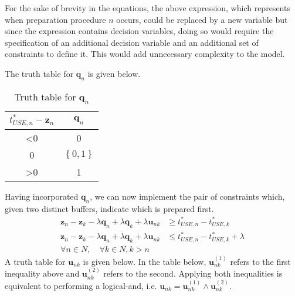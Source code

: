 For the sake of brevity in the equations, the above expression, which
represents when preparation procedure $n$ occurs, could be replaced by a new
variable but since the expression contains decision variables, doing so would
require the specification of an additional decision variable and an additional
set of constraints to define it.
This would add unnecessary complexity to the model.


The truth table for $ \boldsymbol{q}_{n} $ is given below.
\begin{table}[h!]
    \centering
    \caption{Truth table for $\boldsymbol{q}_{n}$}
    \label{tbl.truthq}
    \begin{tabular}{c | c}
        $t_{\mathit{USE},n}^{*} - \boldsymbol{z}_{n}$
        & $\boldsymbol{q}_{n}$\\ \hline
        <0 & 0\\
        0 & $\left\{ 0, 1 \right\}$\\
        >0 & 1\\
    \end{tabular}
\end{table}

Having incorporated $ \boldsymbol{q}_{n} $, we can now implement the pair of
constraints which, given two distinct buffers, indicate which is prepared
first.
\begin{equation}
    \begin{split}
        \boldsymbol{z}_{n} - \boldsymbol{z}_{k} - \lambda \boldsymbol{q}_{n}
        + \lambda \boldsymbol{q}_{k} + \lambda \boldsymbol{u}_{nk} &\ge
        t_{\mathit{USE},n}^{*} - t_{\mathit{USE},k}^{*}\\
        \boldsymbol{z}_{n} - \boldsymbol{z}_{k} - \lambda \boldsymbol{q}_{n}
        + \lambda \boldsymbol{q}_{k} + \lambda \boldsymbol{u}_{nk} &\le
        t_{\mathit{USE},n}^{*} - t_{\mathit{USE},k}^{*} + \lambda\\
        \forall n \in N, \quad \forall k \in N, k > n
    \end{split}
    \label{eq.constr8b}
\end{equation}
A truth table for $\boldsymbol{u}_{nk}$ is given below.
In the table below, $\boldsymbol{u}_{nk}^{\left( 1 \right)}$ refers to the
first inequality above and $\boldsymbol{u}_{nk}^{\left( 2 \right)}$ refers to
the second.  Applying both inequalities is equivalent to performing a
logical-and, i.e. 
$\boldsymbol{u}_{nk} = \boldsymbol{u}_{nk}^{\left( 1 \right)} \land
    \boldsymbol{u}_{nk}^{\left( 2 \right)}$.

